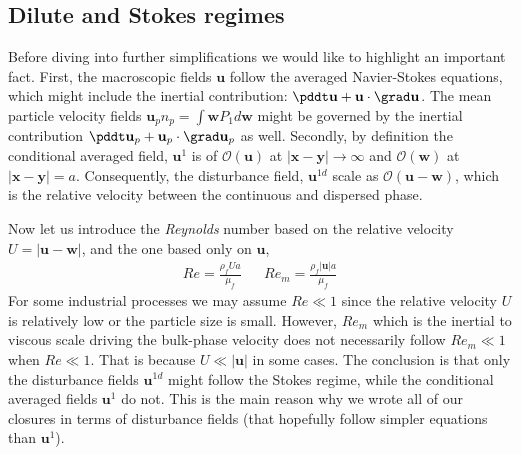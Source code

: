 \subsection{Dilute and Stokes regimes}

Before diving into further simplifications we would like to highlight an important fact. 
First, the macroscopic fields $\textbf{u}$ follow the averaged Navier-Stokes equations, which might include the inertial contribution: $\pddt \textbf{u} + \textbf{u}\cdot \grad \textbf{u}$. 
The mean particle velocity fields $\textbf{u}_p n_p= \int \textbf{w} P_1d\textbf{w}$ might be governed by the inertial contribution $\pddt \textbf{u}_p + \textbf{u}_p\cdot \grad \textbf{u}_p$ as well.   
Secondly, by definition the conditional averaged field, $\textbf{u}^{1}$ is of $\mathcal{O}(\textbf{u})$ at $|\textbf{x}- \textbf{y}|\to \infty$ and $\mathcal{O}(\textbf{w})$ at $|\textbf{x} - \textbf{y}|= a$. 
Consequently, the disturbance field, $\textbf{u}^{1d}$ scale as $\mathcal{O}(\textbf{u} - \textbf{w})$, which is the relative velocity between the continuous and dispersed phase. 

Now let us introduce the \textit{Reynolds} number based on the relative velocity $U =|\textbf{u}- \textbf{w}|$, and the one based only on $\textbf{u}$, 
\begin{align}
    Re = \frac{\rho_f U a}{\mu_f} && 
    Re_m = \frac{\rho_f |\textbf{u}| a}{\mu_f} 
\end{align} 
For some industrial processes we may assume $Re \ll 1$ since the relative velocity $U$ is relatively low or the particle size is small. 
However, $Re_m$ which is the inertial to viscous scale driving the bulk-phase velocity does not necessarily follow $Re_m \ll 1$ when $Re \ll 1$.  
That is because  $U \ll |\textbf{u}|$ in some cases. 
The conclusion is that only the disturbance fields $\textbf{u}^{1d}$ might follow the Stokes regime, while the conditional averaged fields $\textbf{u}^1$ do not. 
This is the main reason why we wrote all of our closures in terms of disturbance fields (that hopefully follow simpler equations than $\textbf{u}^1$). 

